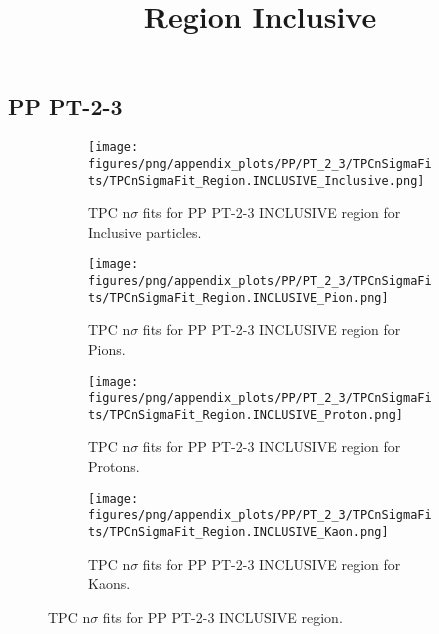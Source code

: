             \subsection{PP PT-2-3}
            \begin{figure}[H]
                \title{Region Inclusive}
                \begin{subfigure}[b]{0.5\textwidth}
                    \centering
                    \texttt{[image: figures/png/appendix\_plots/PP/PT\_2\_3/TPCnSigmaFits/TPCnSigmaFit\_Region.INCLUSIVE\_Inclusive.png]}
                    \caption{TPC n$\sigma$ fits for PP PT-2-3 INCLUSIVE region for Inclusive particles.}
                    \label{fig:appendix_PP_PT-2-3_INCLUSIVE_Inclusive}
                \end{subfigure}
                \begin{subfigure}[b]{0.5\textwidth}
                    \centering
                    \texttt{[image: figures/png/appendix\_plots/PP/PT\_2\_3/TPCnSigmaFits/TPCnSigmaFit\_Region.INCLUSIVE\_Pion.png]}
                    \caption{TPC n$\sigma$ fits for PP PT-2-3 INCLUSIVE region for Pions.}
                    \label{fig:appendix_PP_PT-2-3_INCLUSIVE_Pion}
                \end{subfigure}
                \begin{subfigure}[b]{0.5\textwidth}
                    \centering
                    \texttt{[image: figures/png/appendix\_plots/PP/PT\_2\_3/TPCnSigmaFits/TPCnSigmaFit\_Region.INCLUSIVE\_Proton.png]}
                    \caption{TPC n$\sigma$ fits for PP PT-2-3 INCLUSIVE region for Protons.}
                    \label{fig:appendix_PP_PT-2-3_INCLUSIVE_Proton}
                \end{subfigure}
                \begin{subfigure}[b]{0.5\textwidth}
                    \centering
                    \texttt{[image: figures/png/appendix\_plots/PP/PT\_2\_3/TPCnSigmaFits/TPCnSigmaFit\_Region.INCLUSIVE\_Kaon.png]}
                    \caption{TPC n$\sigma$ fits for PP PT-2-3 INCLUSIVE region for Kaons.}
                    \label{fig:appendix_PP_PT-2-3_INCLUSIVE_Kaon}
                \end{subfigure}
                \caption{TPC n$\sigma$ fits for PP PT-2-3 INCLUSIVE region.}
                \label{fig:appendix_PP_PT-2-3_INCLUSIVE}
            \end{figure}
